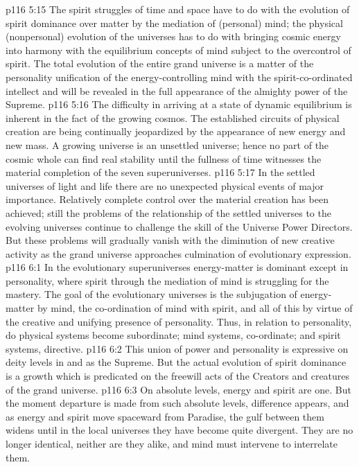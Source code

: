 \vs p116 5:15 The spirit struggles of time and space have to do with the evolution of spirit dominance over matter by the mediation of (personal) mind; the physical (nonpersonal) evolution of the universes has to do with bringing cosmic energy into harmony with the equilibrium concepts of mind subject to the overcontrol of spirit. The total evolution of the entire grand universe is a matter of the personality unification of the energy\hyp{}controlling mind with the spirit\hyp{}co\hyp{}ordinated intellect and will be revealed in the full appearance of the almighty power of the Supreme.
\vs p116 5:16 The difficulty in arriving at a state of dynamic equilibrium is inherent in the fact of the growing cosmos. The established circuits of physical creation are being continually jeopardized by the appearance of new energy and new mass. A growing universe is an unsettled universe; hence no part of the cosmic whole can find real stability until the fullness of time witnesses the material completion of the seven superuniverses.\plusone
\vs p116 5:17 In the settled universes of light and life there are no unexpected physical events of major importance. Relatively complete control over the material creation has been achieved; still the problems of the relationship of the settled universes to the evolving universes continue to challenge the skill of the Universe Power Directors. But these problems will gradually vanish with the diminution of new creative activity as the grand universe approaches culmination of evolutionary expression.
\vs p116 6:1 In the evolutionary superuniverses energy\hyp{}matter is dominant except in personality, where spirit through the mediation of mind is struggling for the mastery. The goal of the evolutionary universes is the subjugation of energy\hyp{}matter by mind, the co\hyp{}ordination of mind with spirit, and all of this by virtue of the creative and unifying presence of personality. Thus, in relation to personality, do physical systems become subordinate; mind systems, co\hyp{}ordinate; and spirit systems, directive.
\vs p116 6:2 This union of power and personality is expressive on deity levels in and as the Supreme. But the actual evolution of spirit dominance is a growth which is predicated on the freewill acts of the Creators and creatures of the grand universe.
\pc \vs p116 6:3 On absolute levels, energy and spirit are one. But the moment departure is made from such absolute levels, difference appears, and as energy and spirit move spaceward from Paradise, the gulf between them widens until in the local universes they have become quite divergent. They are no longer identical, neither are they alike, and mind must intervene to interrelate them.
